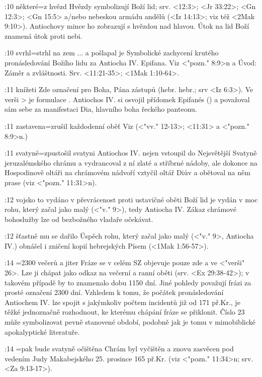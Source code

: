 :10 {některé}={z hvězd} Hvězdy symbolizují Boží lid; srv. <12:3>; <Jr 33:22>; <Gn 12:3>;  <Gn 15:5> a/nebo nebeskou armádu andělů %
(<Iz 14:13>; viz též <2Mak 9:10>). %
Antiochovy mince ho zobrazují s hvězdou nad hlavou. Útok na lid Boží znamená útok proti nebi.

:10 {svrhl}={strhl na zem ... a pošlapal je} Symbolické zachycení krutého pronásledování Božího lidu za Antiocha IV. Epifana. Viz <"pozn." 8:9>n a Úvod: Záměr a zvláštnosti. Srv. <11:21-35>; <1Mak 1:10-64>. %

:11 {knížeti} Zde označení pro Boha, Pána zástupů (hebr. \dopsat hebr.; srv <Iz 6:3>). Ve verši > je formulace . Antiochos IV. si osvojil přídomek Epifanés () a považoval sám sebe za manifestaci Dia, hlavního boha řeckého panteonu. 

:11 {zastavena}={zrušil každodenní oběť} Viz (<"vv." 12-13>; <11:31> a <"pozn." 8:9>n.)

:11 {svatyně}={zpustošil svatyni} Antiochos IV. nejen vstoupil do Nejsvětější Svatyně jeruzalémského chrámu a vydrancoval z ní zlaté a stříbrné nádoby, ale dokonce na Hospodinově oltáři na chrámovém nádvoří vztyčil oltář Diův a obětoval na něm prase (viz <"pozn." 11:31>n).

:12 {vojsko to vydáno v převrácenost proti ustavičné oběti} Boží lid je vydán v moc rohu, který začal jako malý (<"v." 9>), tedy Antiocha IV. Zákaz chrámové bohoslužby lze od bezbožného vladaře očekávat.

:12 {šťastně mu se dařilo} Úspěch rohu, který začal jako malý (<"v." 9>, Antiocha IV.)
obnášel i zničení kopií hebrejských Písem  (<1Mak 1:56-57>). 

:14 {}={2300 večerů a jiter} Fráze  se v celém SZ objevuje pouze zde a ve <"verši" 26>. Lze ji chápat jako odkaz na večerní a ranní oběti (srv. <Ex 29:38-42>); v takovém případě by to znamenalo dobu 1150 dní. Jiné pohledy považují frázi za prosté označení 2300 dní. Vzhledem k tomu, že počátek pronásledování Antiochem IV. lze spojit s jakýmkoliv počtem incidentů již od 171 př.Kr., je těžké jednoznačně rozhodnout, ke kterému chápání fráze se přiklonit.
Číslo 23 může symbolizovat pevně stanovené období, podobně jak je tomu v mimobiblické apokalyptické literatuře.

:14 {}={pak bude svatyně očištěna}  Chrám byl vyčištěn a znovu zasvěcen pod vedením Judy Makabejského 25. prosince 165 př.Kr. (viz <"pozn." 11:34>n; srv. <Za 9:13-17>).

